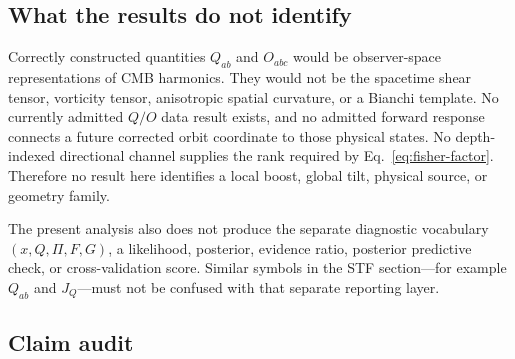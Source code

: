 \documentclass[11pt,a4paper]{article}
\begin{document}
\subsection{What the results do not identify}

Correctly constructed quantities $Q_{ab}$ and $O_{abc}$ would be observer-space
representations of CMB harmonics.  They would not be the spacetime shear
tensor, vorticity tensor, anisotropic spatial curvature, or a Bianchi template.
No currently admitted $Q/O$ data result exists, and no admitted forward
response connects a future corrected orbit coordinate to those physical states.
No depth-indexed directional channel supplies the rank required by
Eq.~\eqref{eq:fisher-factor}.  Therefore no result here identifies a local
boost, global tilt, physical source, or geometry family.

The present analysis also does not produce the separate diagnostic vocabulary
$(x,Q,\Pi,F,G)$, a likelihood, posterior, evidence ratio, posterior predictive
check, or cross-validation score.  Similar symbols in the STF section---for
example $Q_{ab}$ and $J_Q$---must not be confused with that separate reporting
layer.

\subsection{Claim audit}
\end{document}
